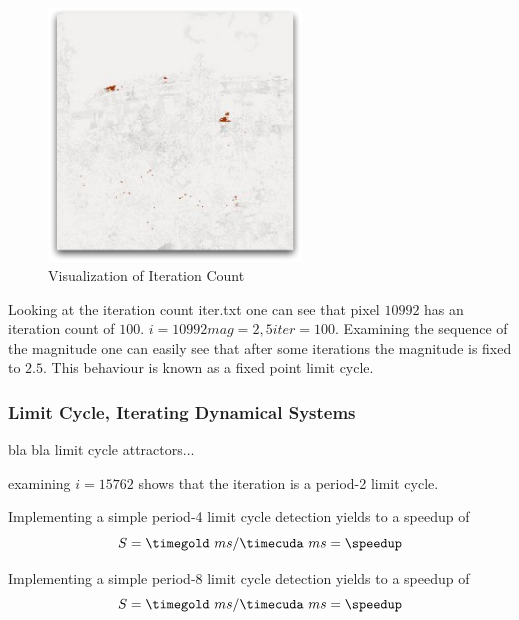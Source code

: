 \begin{figure}[ht]
\centering
\includegraphics[width=0.6\textwidth]{gfx/itr_limitcycle0.pdf}
\caption{Visualization of Iteration Count}
\label{fig:vis_iteration_count}
\end{figure}

Looking at the iteration count  iter.txt one can see that pixel $10992$ has an 
iteration count  of $100$. 
$ i = 10992 mag=2,5 iter=100$. Examining the sequence of the magnitude one can 
easily see that after some iterations the magnitude is fixed to $2.5$. This
behaviour is known as a fixed point limit cycle.

\subsubsection{Limit Cycle, Iterating Dynamical Systems} %
\label{ssub:limit_cycle_iterating_dynamical_systems}
bla bla  limit cycle attractors...


examining $i = 15762$ shows that the iteration is a period-2 limit cycle.

Implementing a simple period-4 limit cycle detection yields to a speedup of
\fpDiv{\speedup}{\timegold}{\timecuda}
\begin{equation*}\label{eq:speedup0}
	S = \timegold\ ms/\timecuda\ ms = \speedup
\end{equation*}

Implementing a simple period-8 limit cycle detection yields to a speedup of
\fpDiv{\speedup}{\timegold}{\timecuda}
\begin{equation*}\label{eq:speedup0}
	S = \timegold\ ms/\timecuda\ ms = \speedup
\end{equation*}


